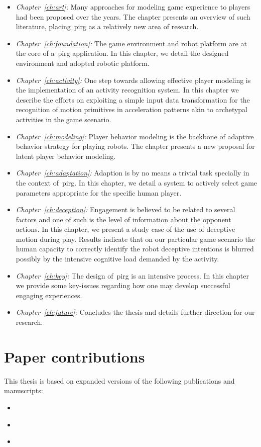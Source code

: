 \begin{itemize}
\item\emph{Chapter~\ref{ch:art}:} Many approaches for modeling %
game experience to players had been proposed over the years. The chapter presents an overview of such literature, placing~\gls{pirg} as a relatively new area of research.
\item\emph{Chapter~\ref{ch:foundation}:} The game environment and robot platform are at the core of a~\gls{pirg} application. In this chapter, we detail the designed environment and adopted robotic platform.
\item\emph{Chapter~\ref{ch:activity}:} One step towards allowing effective player modeling is the implementation of an activity recognition system. In this chapter we describe the efforts on exploiting a simple input data transformation for the recognition of motion primitives in acceleration patterns akin to archetypal activities in the game scenario.
\item\emph{Chapter~\ref{ch:modeling}:} Player behavior modeling is the backbone of adaptive behavior strategy for playing robots. The chapter presents a new proposal for latent player behavior modeling.
\item\emph{Chapter~\ref{ch:adaptation}:} Adaption is by no means a trivial task specially in the context of~\gls{pirg}. In this chapter, we detail a system to actively select game parameters appropriate for the specific human player.
\item\emph{Chapter~\ref{ch:deception}:} Engagement is believed to be related to several factors and one of such is the level of information about the opponent actions. In this chapter, we present a study case of the use of deceptive motion during play. Results indicate that on our particular game scenario the human capacity to correctly identify the robot deceptive intentions is blurred possibly by the intensive cognitive load demanded by the activity.
\item\emph{Chapter~\ref{ch:key}:} The design of~\gls{pirg} is an intensive process. In this chapter we provide some key-issues regarding how one may develop successful engaging experiences.
\item\emph{Chapter~\ref{ch:future}:} Concludes the thesis and details further direction for our research.
\end{itemize}

\section{Paper contributions}
This thesis is based on expanded versions of the following publications and manuscripts:
\begin{itemize}
\item \cite{oliveira_learning_2018}
\item \cite{oliveira_modeling_2017}
\item \cite{oliveira_activity_2017}
\end{itemize}
